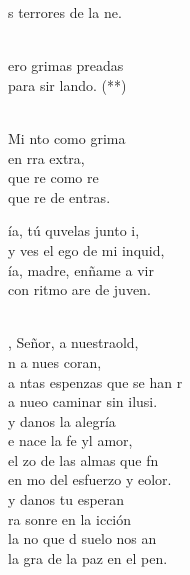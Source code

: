 \documentclass[12pt]{article}
\begin{document}
\begin{multicols*}{2}
\begin{cancion}
	s terrores de la ne.\\\jump\\
	\begin{chorus}%
	ero grimas preadas \\
	para sir lando. (**) \\
	\end{chorus}%
	\jump\\
	Mi nto como grima  \\
	en rra extra,\\
	que re como re \\
	que re de  entras.\\
\end{cancion}%

\begin{cancion}%
	\begin{chorus}%
	ía, tú quvelas junto i,\\
	y ves el ego de mi inquid,\\
	ía, madre, enñame a vir \\
	con ritmo are de juven.\\
	\end{chorus}%
	\jump\\
	, Señor, a nuestraold,\\
	n a nues coran,\\
	a ntas espenzas que se han r\\
	a nueo caminar sin ilusi.\\
	 y danos la alegría \\
	e nace la fe yl amor,\\
	el zo de las almas que fn\\
	en mo del esfuerzo y eolor.\\
	 y danos tu esperan  \\
	ra sonre en la icción\\
	la no que d suelo nos an\\
	la gra de la paz en el pen. \\
\end{cancion}%


\end{multicols*}
\end{document}
